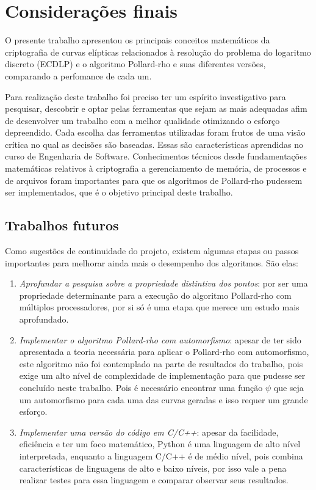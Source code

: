 \chapter{Considerações finais}
O presente trabalho apresentou os principais conceitos matemáticos da criptografia de curvas elípticas relacionados à resolução do problema do logaritmo discreto (ECDLP) e o algoritmo Pollard-rho e suas diferentes versões, comparando a perfomance de cada um.

Para realização deste trabalho foi preciso ter um espírito investigativo para pesquisar, descobrir e optar pelas ferramentas que sejam as mais adequadas afim de desenvolver um trabalho com a melhor qualidade otimizando o esforço depreendido. Cada escolha das ferramentas utilizadas foram frutos de uma visão crítica no qual as decisões são baseadas. Essas são características aprendidas no curso de Engenharia de Software. Conhecimentos técnicos desde fundamentações matemáticas relativos à criptografia a gerenciamento de memória, de processos e de arquivos foram importantes para que os algoritmos de Pollard-rho pudessem ser implementados, que é o objetivo principal deste trabalho.


\section{Trabalhos futuros}
Como sugestões de continuidade do projeto, existem algumas etapas ou passos importantes para melhorar ainda mais o desempenho dos algoritmos. São elas:

\begin{enumerate}
	\item \textit{Aprofundar a pesquisa sobre a propriedade distintiva dos pontos}: por ser uma propriedade determinante para a execução do algoritmo Pollard-rho com múltiplos processadores, por si só é uma etapa que merece um estudo mais aprofundado.
	\item \textit{Implementar o algoritmo Pollard-rho com automorfismo}: apesar de ter sido apresentada a teoria necessária para aplicar o Pollard-rho com automorfismo, este algoritmo não foi contemplado na parte de resultados do trabalho, pois exige um alto nível de complexidade de implementação para que pudesse ser concluído neste trabalho. Pois é necessário encontrar uma função \(\psi\) que seja um automorfismo para cada uma das curvas geradas e isso requer um grande esforço.
	\item \textit{Implementar uma versão do código em C/C++}: apesar da facilidade, eficiência e ter um foco matemático, Python é uma linguagem de alto nível interpretada, enquanto a linguagem C/C++ é de médio nível, pois combina características de linguagens de alto e baixo níveis, por isso vale a pena realizar testes para essa linguagem e comparar observar seus resultados.
\end{enumerate}
